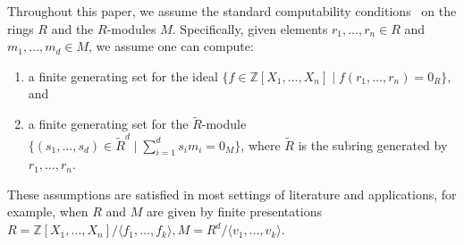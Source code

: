\documentclass[letterpaper, 11pt, thm-restate]{article}
\numberwithin{equation}{section}
\newcommand{\Z}{\mathbb{Z}}
\newcommand{\mZ}{\mathfrak{Z}}
\newcommand{\ba}{\boldsymbol{a}}
\newcommand{\br}{\boldsymbol{r}}
\newcommand{\gen}[1]{\langle {#1} \rangle}
\theoremstyle{definition}
\theoremstyle{definition}
\theoremstyle{definition}
\begin{document}
Throughout this paper, we assume the standard computability conditions~\cite{baumslag1981computable} on the rings $R$ and the $R$-modules $M$.
Specifically, given elements $r_1, \ldots, r_n \in R$ and $m_1, \ldots, m_d \in M$, we assume one can compute:
\begin{enumerate}[nosep, label=(\roman*)]
    \item a finite generating set for the ideal $\{f \in \Z[X_1, \ldots, X_n] \mid f(r_1, \ldots, r_n) = 0_R\}$, and
    \item a finite generating set for the $\widetilde{R}$-module $\{(s_1, \ldots, s_d) \in \widetilde{R}^d \mid \sum_{i = 1}^d s_i m_i = 0_M\}$, where $\widetilde{R}$ is the subring generated by $r_1, \ldots, r_n$.
\end{enumerate}
These assumptions are satisfied in most settings of literature and applications, for example, when $R$ and $M$ are given by finite presentations $R = \Z[X_1, \ldots, X_n]/\gen{f_1, \ldots, f_k}, M = R^d/\gen{v_1, \ldots, v_k}$.

\end{document}
